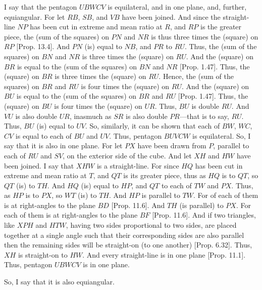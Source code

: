 \begin{Parallel}{}{}
{I say that the pentagon $UBWCV$ is equilateral, and in one plane, and,
further, equiangular. For let $RB$, $SB$, and $VB$ have been joined. 
And since the straight-line $NP$ has been cut in extreme and mean
ratio at $R$, and $RP$ is the greater piece,  the (sum of the squares)
on $PN$ and $NR$ is thus three times the (square) on $RP$ [Prop. 13.4].
And $PN$ (is) equal to $NB$, and $PR$ to $RU$. 
Thus, the (sum of the squares) on $BN$ and $NR$ is three times the
(square) on $RU$. And the (square) on $BR$ is equal to the (sum of the squares) on $BN$ and $NR$ [Prop. 1.47].  
Thus, the (square) on $BR$ is three times the (square) on $RU$. 
Hence, the (sum of the
squares) on $BR$ and $RU$ is four times the (square) on $RU$. And
the (square)
on $BU$ is equal to the (sum of the squares) on $BR$ and $RU$ [Prop. 1.47]. Thus, the (square) on $BU$ is four times the
(square) on $UR$.  Thus, $BU$ is double $RU$.  And
$VU$ is also double $UR$, inasmuch as $SR$ is also double $PR$---that is to say, $RU$. Thus, $BU$ (is) equal to $UV$. So, similarly, it can be shown
that  each of $BW$, $WC$, $CV$ is equal to each of $BU$ and $UV$. 
Thus, pentagon $BUVCW$ is equilateral. So, I say that it is also in one plane. For let $PX$ have been drawn from $P$, parallel to
each of $RU$ and $SV$, on the exterior side of the cube. And let
$XH$ and $HW$ have been joined. I say that $XHW$ is a straight-line.
For since $HQ$ has been cut in extreme and mean ratio at $T$,
and  $QT$  is its greater piece, thus as $HQ$ is to $QT$, so $QT$
(is) to $TH$. And $HQ$ (is) equal to $HP$, and $QT$ to each of
$TW$ and $PX$. Thus, as $HP$ is to $PX$, so $WT$ (is) to
$TH$. And $HP$ is parallel to $TW$. For of each of them is at right-angles
to the plane $BD$ [Prop. 11.6]. And $TH$ (is parallel) to
$PX$. For each of them is at right-angles to the plane $BF$ [Prop. 11.6].
And if two triangles, like
$XPH$ and $HTW$, having two sides proportional to two sides,
are placed together at a single angle  such that their corresponding sides are also parallel then the remaining sides will be straight-on (to one another) [Prop. 6.32]. Thus, $XH$ is straight-on to
$HW$. And every straight-line is in one plane [Prop. 11.1]. Thus,
pentagon $UBWCV$ is in one plane.

So, I say that it is also equiangular.

}
\end{Parallel}
